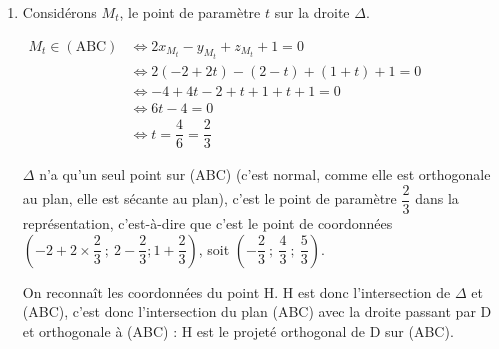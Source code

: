 \begin{enumerate}
\begin{enumerate}
 		\item $\vect{u}$ est donc un vecteur normal au plan (ABC), d'après la question précédente.

Par propriété, on en déduit qu'une équation de (ABC) est de la forme :

$2x - y + z + d = 0$\quad où $d$ est un réel.

 $\begin{aligned}
 \mathrm{A} \in (\mathrm{ABC})
 &\iff 2x_{\mathrm{A}} - y_{\mathrm{A}} + z_{\mathrm{A}} + d = 0\\
 &\iff 2\times 1 - 3 + 0 + d = 0\\
 &\iff -1 + d = 0\\
 &\iff d = 1
\end{aligned}$

Une équation de (ABC) est donc bien \quad $2x - y + z + 1 = 0$.

 		\item $\Delta$ contient $\mathrm{D}(-2~;~2~;~1)$ et est dirigée par $\vect{u}$, donc, par propriété, une représentation paramétrique de $\Delta$ est :\quad $\begin{cases}
 			x=-2 + 2t\\
 			y= 2 - t\\
 			z= 1 + t\\
 		\end{cases}$\quad avec $t \in \R$
	 \end{enumerate}
 \item Considérons $M_t$, le point de paramètre $t$ sur la droite $\Delta$.

 $\begin{aligned}
		M_t \in (\mathrm{ABC})
		&\iff 2x_{M_t} - y_{M_t} + z_{M_t} + 1 = 0\\
		&\iff 2(-2+2t) - (2 - t) + (1 + t) + 1 = 0\\
		&\iff -4 + 4t - 2 + t + 1 + t + 1 = 0\\
		&\iff 6t - 4 = 0\\
		&\iff t = \dfrac{4}{6} = \dfrac{2}{3}
 \end{aligned}$

$\Delta$ n'a qu'un seul point sur (ABC) (c'est normal, comme elle est orthogonale au plan, elle est sécante au plan), c'est le point de paramètre $\dfrac{2}{3}$ dans la représentation, c'est-à-dire que c'est le point de coordonnées $\left(-2 + 2\times \dfrac{2}{3}~;~2 - \dfrac{2}{3} ; 1 + \dfrac{2}{3}\right)$, soit $\left(-\dfrac{2}{3}~;~\dfrac{4}{3}~;~\dfrac{5}{3}\right)$.

On reconnaît les coordonnées du point H. H est donc l'intersection de $\Delta$ et (ABC), c'est donc l'intersection du plan (ABC) avec la droite passant par D et orthogonale à (ABC) : H est le projeté orthogonal de D sur (ABC).


\end{enumerate}
